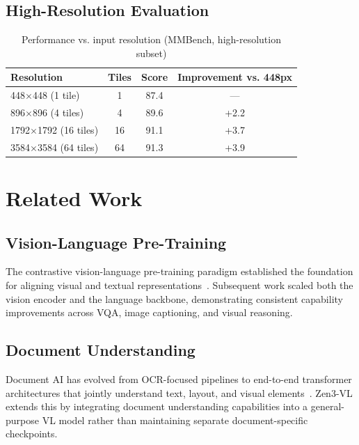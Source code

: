 \documentclass[11pt,a4paper]{article}
\begin{document}
\subsection{High-Resolution Evaluation}

\begin{table}[H]
\centering
\caption{Performance vs. input resolution (MMBench, high-resolution subset)}
\begin{tabular}{lccc}
\toprule
\textbf{Resolution} & \textbf{Tiles} & \textbf{Score} & \textbf{Improvement vs. 448px} \\
\midrule
448$\times$448 (1 tile)    & 1   & 87.4 & --- \\
896$\times$896 (4 tiles)   & 4   & 89.6 & +2.2 \\
1792$\times$1792 (16 tiles) & 16 & 91.1 & +3.7 \\
3584$\times$3584 (64 tiles) & 64 & 91.3 & +3.9 \\
\bottomrule
\end{tabular}
\label{tab:resolution}
\end{table}

\section{Related Work}
\label{sec:related}

\subsection{Vision-Language Pre-Training}

The contrastive vision-language pre-training paradigm established the foundation
for aligning visual and textual representations~\cite{clip}. Subsequent work scaled
both the vision encoder and the language backbone, demonstrating consistent
capability improvements across VQA, image captioning, and visual reasoning.

\subsection{Document Understanding}

Document AI has evolved from OCR-focused pipelines to end-to-end transformer
architectures that jointly understand text, layout, and visual elements~\cite{layoutlm}.
Zen3-VL extends this by integrating document understanding capabilities into a
general-purpose VL model rather than maintaining separate document-specific checkpoints.
\end{document}
